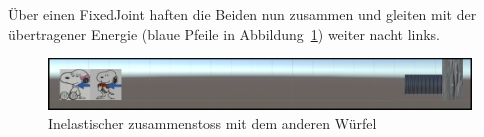 \documentclass[../main.tex]{subfiles}
\begin{document}
\begin{enumerate}
     Über einen FixedJoint haften die Beiden nun zusammen und gleiten mit der übertragener Energie
     (blaue Pfeile in Abbildung~\ref{fig:2Lab_2dPictureNr3}) weiter nacht links.
     \begin{figure}[H]
                \begin{center}
                    \centerline{\includegraphics[width=155mm]{./images/2Lab_2dPictureNr3.png}}
                    \caption{Inelastischer zusammenstoss mit dem anderen Würfel}
                    \label{fig:2Lab_2dPictureNr3}
                \end{center}
     \end{figure}
 \end{enumerate}
\end{document}
